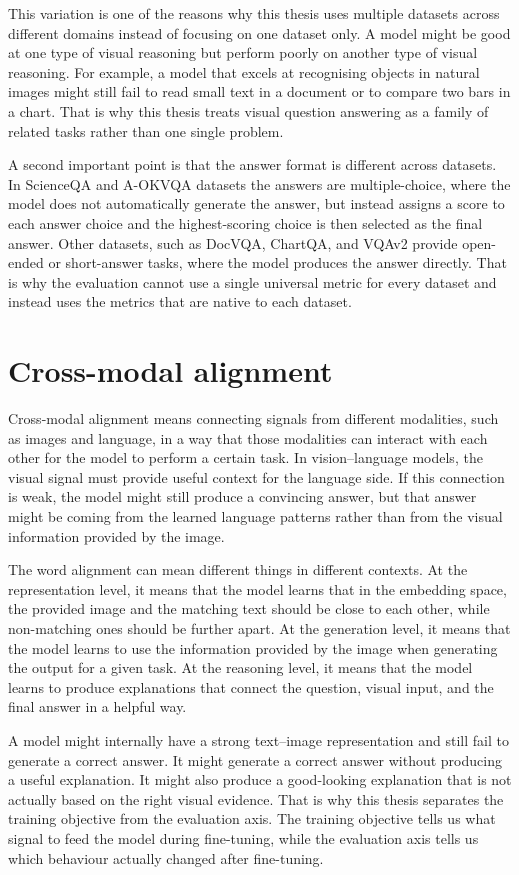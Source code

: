 \documentclass[12pt,bibliography=totoc,listof=totoc,BCOR=5mm,DIV=12,oneside,open=any]{scrbook}
\begin{document}
This variation is one of the reasons why this thesis uses multiple datasets across different domains instead of focusing on one dataset only.
A model might be good at one type of visual reasoning but perform poorly on another type of visual reasoning.
For example, a model that excels at recognising objects in natural images might still fail to read small text in a document or to compare two bars in a chart.
That is why this thesis treats visual question answering as a family of related tasks rather than one single problem.

A second important point is that the answer format is different across datasets.
In ScienceQA and A-OKVQA datasets the answers are multiple-choice, where the model does not automatically generate the answer,
but instead assigns a score to each answer choice and the highest-scoring choice is then selected as the final answer.
Other datasets, such as DocVQA, ChartQA, and VQAv2 provide open-ended or short-answer tasks, where the model produces the answer directly.
That is why the evaluation cannot use a single universal metric for every dataset and instead uses the metrics
that are native to each dataset.


\section{Cross-modal alignment}
Cross-modal alignment means connecting signals from different modalities, such as images and language,
in a way that those modalities can interact with each other for the model to perform a certain task.
In vision--language models, the visual signal must provide useful context for the language side.
If this connection is weak, the model might still produce a convincing answer, but that answer might be coming from
the learned language patterns rather than from the visual information provided by the image.

The word alignment can mean different things in different contexts.
At the representation level, it means that the model learns that in the embedding space, the provided image and the matching text should be close to each other, while non-matching ones should be further apart.
At the generation level, it means that the model learns to use the information provided by the image when generating the output for a given task.
At the reasoning level, it means that the model learns to produce explanations that connect the question, visual input, and the final answer in a helpful way.

A model might internally have a strong text--image representation and still fail to generate a correct answer.
It might generate a correct answer without producing a useful explanation.
It might also produce a good-looking explanation that is not actually based on the right visual evidence.
That is why this thesis separates the training objective from the evaluation axis.
The training objective tells us what signal to feed the model during fine-tuning,
while the evaluation axis tells us which behaviour actually changed after fine-tuning. 
\end{document}
